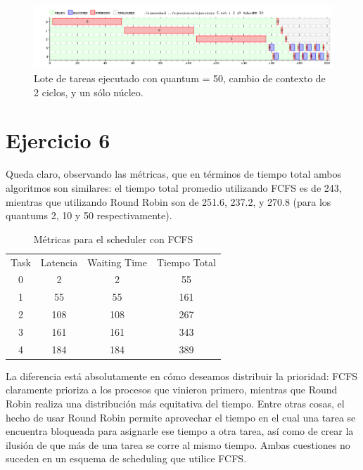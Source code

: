 \documentclass{article}
\begin{document}
\begin{figure}[h!]
\caption{Lote de tareas ejecutado con quantum = 50, cambio de contexto de 2 ciclos, y un sólo núcleo. \label{grf:ex5-50}}
\centering
\includegraphics[width=15cm]{../ejercicios/ejercicio 5 - quantum 50}
\end{figure}

\section{Ejercicio 6}

Queda claro, observando las métricas, que en términos de tiempo total ambos algoritmos son similares: el tiempo total promedio utilizando FCFS es de 243, mientras que utilizando Round Robin son de 251.6, 237.2, y 270.8 (para los quantums 2, 10 y 50 respectivamente).

\begin{table}[h!]
\centering
\caption{Métricas para el scheduler con FCFS}
\label{tbl:ex6}
\begin{tabular}{cccc}
Task & Latencia & Waiting Time & Tiempo Total \\
0    & 2        & 2            & 55           \\
1    & 55       & 55           & 161           \\
2    & 108      & 108          & 267           \\
3    & 161      & 161          & 343           \\
4    & 184      & 184          & 389          
\end{tabular}
\end{table}

La diferencia está absolutamente en cómo deseamos distribuir la prioridad: FCFS claramente prioriza a los procesos que vinieron primero, mientras que Round Robin realiza una distribución más equitativa del tiempo. Entre otras cosas, el hecho de usar Round Robin permite aprovechar el tiempo en el cual una tarea se encuentra bloqueada para asignarle ese tiempo a otra tarea, así como de crear la ilusión de que más de una tarea se corre al mismo tiempo. Ambas cuestiones no suceden en un esquema de scheduling que utilice FCFS.
\end{document}
